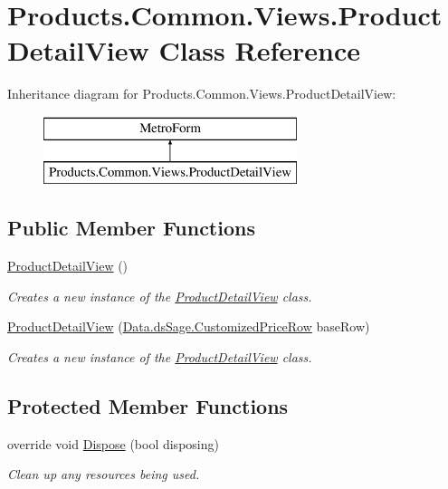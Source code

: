 \hypertarget{class_products_1_1_common_1_1_views_1_1_product_detail_view}{}\section{Products.\+Common.\+Views.\+Product\+Detail\+View Class Reference}
\label{class_products_1_1_common_1_1_views_1_1_product_detail_view}
Inheritance diagram for Products.\+Common.\+Views.\+Product\+Detail\+View\+:\begin{figure}[H]
\begin{center}
\leavevmode
\includegraphics[height=2.000000cm]{class_products_1_1_common_1_1_views_1_1_product_detail_view}
\end{center}
\end{figure}
\subsection*{Public Member Functions}
\begin{DoxyCompactItemize}
\item 
\hyperlink{class_products_1_1_common_1_1_views_1_1_product_detail_view_a701b3db1fd974b264d886dfa131b31ec}{Product\+Detail\+View} ()
\begin{DoxyCompactList}\small\item\em Creates a new instance of the \hyperlink{class_products_1_1_common_1_1_views_1_1_product_detail_view}{Product\+Detail\+View} class. \end{DoxyCompactList}\item 
\hyperlink{class_products_1_1_common_1_1_views_1_1_product_detail_view_acd08ebc413016ae9363734a4773df70f}{Product\+Detail\+View} (\hyperlink{class_products_1_1_data_1_1ds_sage_1_1_customized_price_row}{Data.\+ds\+Sage.\+Customized\+Price\+Row} base\+Row)
\begin{DoxyCompactList}\small\item\em Creates a new instance of the \hyperlink{class_products_1_1_common_1_1_views_1_1_product_detail_view}{Product\+Detail\+View} class. \end{DoxyCompactList}\end{DoxyCompactItemize}
\subsection*{Protected Member Functions}
\begin{DoxyCompactItemize}
\item 
override void \hyperlink{class_products_1_1_common_1_1_views_1_1_product_detail_view_a9a616ae3f8e5c95f9d3b50c455ac03c8}{Dispose} (bool disposing)
\begin{DoxyCompactList}\small\item\em Clean up any resources being used. \end{DoxyCompactList}\end{DoxyCompactItemize}



